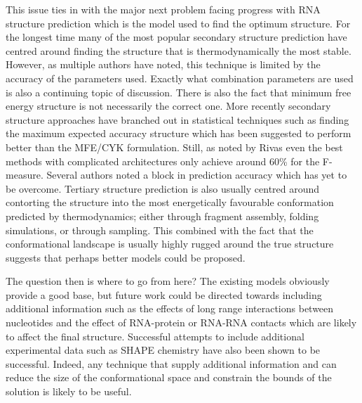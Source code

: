 \documentclass[journal]{IEEEtran}
\begin{document}
This issue ties in with the major next problem facing progress with RNA structure prediction which is the model used to find the optimum structure. For the longest time many of the most popular secondary structure prediction have centred around finding the structure that is thermodynamically the most stable. However, as multiple authors have noted, this technique is limited by the accuracy of the parameters used. Exactly what combination parameters are used is also a continuing topic of discussion. There is also the fact that minimum free energy structure is not necessarily the correct one. More recently secondary structure approaches have branched out in statistical techniques such as finding the maximum expected accuracy structure which has been suggested to perform better than the MFE/CYK formulation. Still, as noted by Rivas \cite{rivas2013four} even the best methods with complicated architectures only achieve around 60\% for the F-measure. Several authors noted a block in prediction accuracy which has yet to be overcome. Tertiary structure prediction is also usually centred around contorting the structure into the most energetically favourable conformation predicted by thermodynamics; either through fragment assembly, folding simulations, or through sampling. This combined with the fact that the conformational landscape is usually highly rugged around the true structure suggests that perhaps better models could be proposed. 

The question then is where to go from here? The existing models obviously provide a good base, but future work could be directed towards including additional information such as the effects of long range interactions between nucleotides and the effect of RNA-protein or RNA-RNA contacts which are likely to affect the final structure. Successful attempts to include additional experimental data such as SHAPE chemistry have also been shown to be successful. Indeed, any technique that supply additional information and can reduce the size of the conformational space and constrain the bounds of the solution is likely to be useful.
\end{document}
